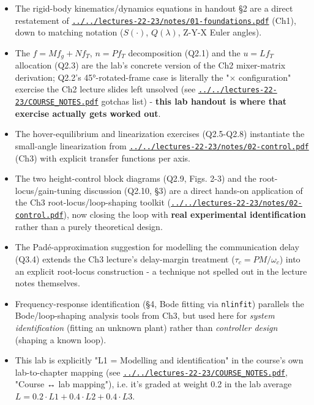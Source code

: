 \documentclass[11pt]{article}
\begin{document}
\begin{itemize}
\item The rigid-body kinematics/dynamics equations in handout §2 are a direct restatement of \href{../../lectures-22-23/notes/01-foundations.pdf}{\texttt{../../lectures-22-23/notes/01-\allowbreak{}foundations.pdf}} (Ch1), down to matching notation ($S(\cdot)$, $Q(\lambda)$, Z-Y-X Euler angles).
\item The $f=Mf_g+Nf_T$, $n=Pf_T$ decomposition (Q2.1) and the $u=Lf_T$ allocation (Q2.3) are the lab's concrete version of the Ch2 mixer-matrix derivation; Q2.2's 45°-rotated-frame case is literally the "× configuration" exercise the Ch2 lecture slides left unsolved (see \href{../../lectures-22-23/COURSE_NOTES.pdf}{\texttt{../../lectures-22-23/COURSE\_\allowbreak{}NOTES.pdf}} gotchas list) - \textbf{this lab handout is where that exercise actually gets worked out}.
\item The hover-equilibrium and linearization exercises (Q2.5-Q2.8) instantiate the small-angle linearization from \href{../../lectures-22-23/notes/02-control.pdf}{\texttt{../../lectures-22-23/notes/02-\allowbreak{}control.pdf}} (Ch3) with explicit transfer functions per axis.
\item The two height-control block diagrams (Q2.9, Figs. 2-3) and the root-locus/gain-tuning discussion (Q2.10, §3) are a direct hands-on application of the Ch3 root-locus/loop-shaping toolkit (\href{../../lectures-22-23/notes/02-control.pdf}{\texttt{../../lectures-22-23/notes/02-\allowbreak{}control.pdf}}), now closing the loop with \textbf{real experimental identification} rather than a purely theoretical design.
\item The Padé-approximation suggestion for modelling the communication delay (Q3.4) extends the Ch3 lecture's delay-margin treatment ($\tau_c = PM/\omega_c$) into an explicit root-locus construction - a technique not spelled out in the lecture notes themselves.
\item Frequency-response identification (§4, Bode fitting via \texttt{nlinfit}) parallels the Bode/loop-shaping analysis tools from Ch3, but used here for \textit{system identification} (fitting an unknown plant) rather than \textit{controller design} (shaping a known loop).
\item This lab is explicitly "L1 = Modelling and identification" in the course's own lab-to-chapter mapping (see \href{../../lectures-22-23/COURSE_NOTES.pdf}{\texttt{../../lectures-22-23/COURSE\_\allowbreak{}NOTES.pdf}}, "Course ↔ lab mapping"), i.e. it's graded at weight 0.2 in the lab average $L = 0.2\cdot L1 + 0.4\cdot L2 + 0.4\cdot L3$.
\end{itemize}
\end{document}
